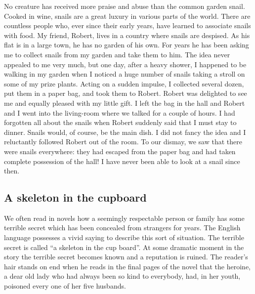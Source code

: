 \documentclass[11pt]{article}
\begin{document}
No creature has received more praise and abuse than the common garden snail. Cooked in wine, snails are a great luxury in various parts of the world. There are countless people who, ever since their early years, have learned to associate snails with food. My friend, Robert, lives in a country where snails are despised. As his flat is in a large town, he has no garden of his own. For years he has been asking me to collect snails from my garden and take them to him. The idea never appealed to me very much, but one day, after a heavy shower, I happened to be walking in my garden when I noticed a huge number of snails taking a stroll on some of my prize plants. Acting on a sudden impulse, I collected several dozen, put them in a paper bag, and took them to Robert. Robert was delighted to see me and equally pleased with my little gift. I left the bag in the hall and Robert and I went into the living-room where we talked for a couple of hours. I had forgotten all about the snails when Robert suddenly said that I must stay to dinner. Snails would, of course, be the main dish. I did not fancy the idea and I reluctantly followed Robert out of the room. To our dismay, we saw that there were snails everywhere: they had escaped from the paper bag and had taken complete possession of the hall! I have never been able to look at a snail since then. 
\subsection{A skeleton in the cupboard}
\label{sec-1-24}

We often read in novels how a seemingly respectable person or family has some terrible secret which has been concealed from strangers for years. The English language possesses a vivid saying to describe this sort of situation. The terrible secret is called ``a skeleton in the cup board''. At some dramatic moment in the story the terrible secret becomes known and a reputation is ruined. The reader's hair stands on end when he reads in the final pages of the novel that the heroine, a dear old lady who had always been so kind to everybody, had, in her youth, poisoned every one of her five husbands. 
\end{document}
